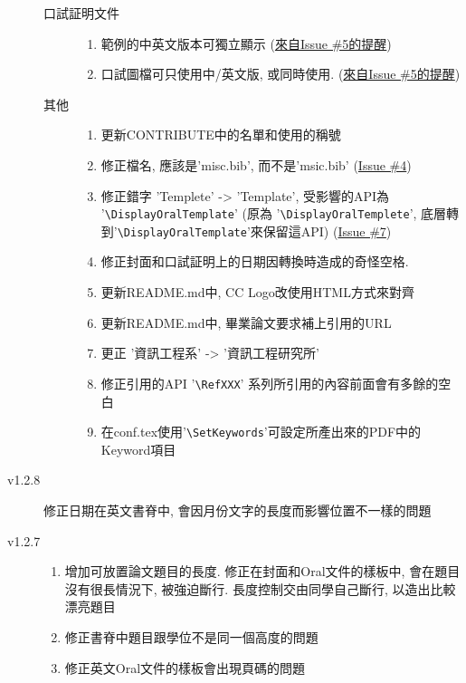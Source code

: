 \begin{description}
\begin{description}
\begin{enumerate}
        \end{enumerate}
      \item[口試証明文件] \hfill
        \begin{enumerate}
          \item 範例的中英文版本可獨立顯示 (\href{https://github.com/wengan-li/ncku-thesis-template-latex/issues/5}{來自Issue \#5的提醒})
          \item 口試圖檔可只使用中/英文版, 或同時使用. (\href{https://github.com/wengan-li/ncku-thesis-template-latex/issues/5}{來自Issue \#5的提醒})
        \end{enumerate}
      \item[其他] \hfill
        \begin{enumerate}
          \item 更新CONTRIBUTE中的名單和使用的稱號
          \item 修正檔名, 應該是'misc.bib', 而不是'msic.bib' (\href{https://github.com/wengan-li/ncku-thesis-template-latex/issues/4}{Issue \#4})
          \item 修正錯字 'Templete' -> 'Template', 受影響的API為 '\verb|\DisplayOralTemplate|' (原為 '\verb|\DisplayOralTemplete|', 底層轉到'\verb|\DisplayOralTemplate|'來保留這API) (\href{https://github.com/wengan-li/ncku-thesis-template-latex/issues/7}{Issue \#7})
          \item 修正封面和口試証明上的日期因轉換時造成的奇怪空格.
          \item 更新README.md中, CC Logo改使用HTML方式來對齊
          \item 更新README.md中, 畢業論文要求補上引用的URL
          \item 更正 '資訊工程系' -> '資訊工程研究所'
          \item 修正引用的API '\verb|\RefXXX|' 系列所引用的內容前面會有多餘的空白
          \item 在conf.tex使用'\verb|\SetKeywords|'可設定所產出來的PDF中的Keyword項目
        \end{enumerate}
    \end{description}

  \item[v1.2.8] 修正日期在英文書脊中, 會因月份文字的長度而影響位置不一樣的問題

  \item[v1.2.7] \hfill
    \begin{enumerate}
      \item 增加可放置論文題目的長度. 修正在封面和Oral文件的樣板中, 會在題目沒有很長情況下, 被強迫斷行. 長度控制交由同學自己斷行, 以造出比較漂亮題目
      \item 修正書脊中題目跟學位不是同一個高度的問題
      \item 修正英文Oral文件的樣板會出現頁碼的問題
    \end{enumerate}


\end{description}
